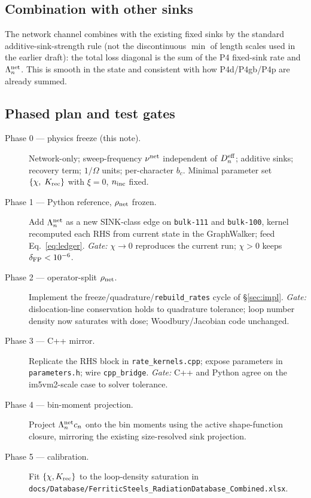\documentclass[11pt,a4paper]{article}
\begin{document}
\subsection*{Combination with other sinks}

The network channel combines with the existing fixed sinks by the standard
additive-sink-strength rule (not the discontinuous $\min$ of length scales used
in the earlier draft): the total loss diagonal is the sum of the P4 fixed-sink
rate and $\Lambda_n^{\rm net}$.  This is smooth in the state and consistent with
how P4d/P4gb/P4p are already summed.

\subsection*{Phased plan and test gates}

\begin{description}
  \item[Phase 0 — physics freeze (this note).] Network-only; sweep-frequency
        $\nu^{\rm net}$ independent of $D_n^{\rm eff}$; additive sinks; recovery
        term; $1/\Omega$ units; per-character $b_c$.  Minimal parameter set
        $\{\chi,\;K_{\rm rec}\}$ with $\xi=0$, $n_{\rm inc}$ fixed.
  \item[Phase 1 — Python reference, $\rho_{\rm net}$ frozen.] Add
        $\Lambda_n^{\rm net}$ as a new SINK-class edge on \texttt{bulk-111} and
        \texttt{bulk-100}, kernel recomputed each RHS from current state in the
        GraphWalker; feed Eq.~\eqref{eq:ledger}.
        \emph{Gate:} $\chi\!\to\!0$ reproduces the current run; $\chi>0$ keeps
        $\delta_{\rm FP}<10^{-6}$.
  \item[Phase 2 — operator-split $\rho_{\rm net}$.] Implement the
        freeze/quadrature/\texttt{rebuild\_rates} cycle of
        \S\ref{sec:impl}.  \emph{Gate:} dislocation-line conservation holds to
        quadrature tolerance; loop number density now saturates with dose;
        Woodbury/Jacobian code unchanged.
  \item[Phase 3 — C++ mirror.] Replicate the RHS block in
        \texttt{rate\_kernels.cpp}; expose parameters in \texttt{parameters.h};
        wire \texttt{cpp\_bridge}.  \emph{Gate:} C++ and Python agree on the
        im5vm2-scale case to solver tolerance.
  \item[Phase 4 — bin-moment projection.] Project $\Lambda_n^{\rm net}c_n$ onto
        the bin moments using the active shape-function closure, mirroring the
        existing size-resolved sink projection.
  \item[Phase 5 — calibration.] Fit $\{\chi,K_{\rm rec}\}$ to the loop-density
        saturation in
        \texttt{docs/Database/FerriticSteels\_RadiationDatabase\_Combined.xlsx}.
\end{description}
\end{document}
